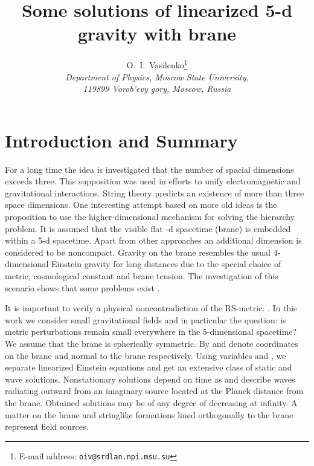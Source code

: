 \documentclass[letterpaper,12pt]{article}
\title{Some solutions of linearized 5-d gravity with brane}
\author{O.~I.~Vasilenko\thanks{E-mail address:
\texttt{oiv@srdlan.npi.msu.su}}
\\[6pt]
\emph{\small Department of Physics, Moscow State University,}\\
\emph{\small  119899 Vorob'evy gory, Moscow, Russia}}
\date{}
\begin{document}
\maketitle {}

\section{Introduction and Summary}\label{intro}
For a long time the idea is investigated that the number of
spacial dimensions exceeds three.  This supposition was used in
efforts to unify electromagnetic and gravitational interactions.
String theory predicts an existence of more than three space
dimensions. One interesting attempt \cite{Randall99a,Randall99b}
based on more old ideas \cite{Rubakov83, Akama83, Visser85} is the
proposition to use the higher-dimensional mechanism for solving
the hierarchy problem. It is assumed that the visible flat
\coordHE{}-d spacetime (brane) is embedded within a 5-d spacetime.
Apart from other approaches an additional dimension is considered
to be noncompact. Gravity on the brane resembles the usual
4-dimensional Einstein gravity for long distances due to the
special choice of metric, cosmological constant and brane tension.
The investigation of this scenario shows that  some problems exist
\cite{Mueck00}.

It is important to verify a physical noncontradiction of the
RS-metric: \coordHE{}. In this work we
consider small gravitational fields and in particular the
question: is metric perturbations remain small everywhere in the
5-dimensional spacetime? We assume that the brane is spherically
symmetric. By \coordHE{} and \coordHE{} denote coordinates on the brane and
normal to the brane respectively. Using variables
\coordHE{} and \coordHE{}, we separate linearized
Einstein equations and get an extensive class of static and wave
solutions. Nonstationary solutions depend on time \coordHE{} as
\coordHE{} and describe waves radiating outward from an
imaginary source located at the Planck distance \coordHE{} from the
brane. Obtained solutions may be of any degree of decreasing at
infinity. A matter on the brane and stringlike formations lined
orthogonally to the brane represent field sources.
\end{document}

